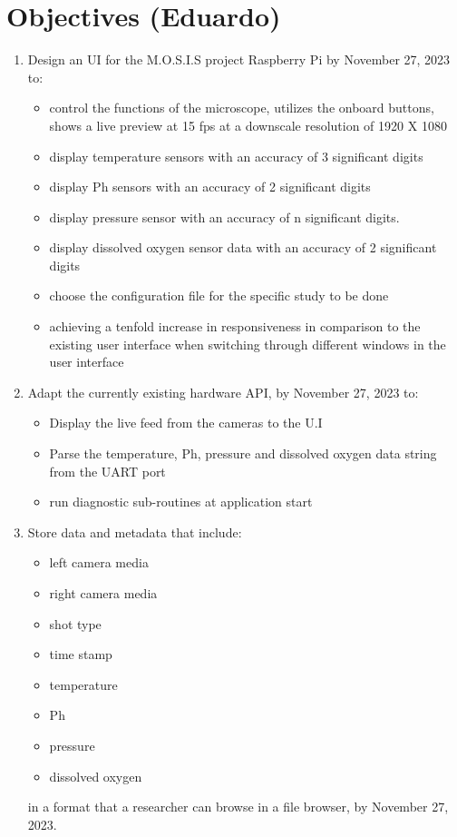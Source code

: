 \section{Objectives (Eduardo)}
\begin{enumerate}
    \item Design an UI for the M.O.S.I.S project Raspberry Pi by November 27, 2023 to:
    \begin{itemize}
        \item control the functions of the microscope, utilizes the onboard buttons, shows a live preview at 15 fps at a downscale resolution of 1920 X 1080
        \item display temperature sensors with an accuracy of 3 significant digits
        \item display Ph sensors with an accuracy of 2 significant digits
        \item display pressure sensor with an accuracy of n significant digits.
        \item display dissolved oxygen sensor data with an accuracy of 2 significant digits
        \item choose the configuration file for the specific study to be done
        \item achieving a tenfold increase in responsiveness in comparison to the existing user interface when switching through different windows in the user interface
    \end{itemize} 
    \item Adapt the currently existing hardware API, by November 27, 2023 to:
    \begin{itemize}
        \item Display the live feed from the cameras to the U.I 
        \item Parse the temperature, Ph, pressure and dissolved oxygen data string from the UART port
        \item run diagnostic sub-routines at application start
    \end{itemize}
    \item Store data and metadata that include:
    \begin{itemize}
        \item left camera media
        \item right camera media
        \item shot type
        \item time stamp
        \item temperature
        \item Ph
        \item pressure
        \item dissolved oxygen
    \end{itemize}
    in a format that a researcher can browse in a file browser, by November 27, 2023.
\end{enumerate}